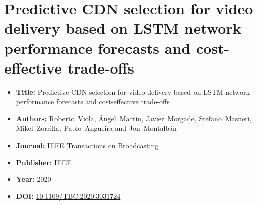 

\section[Predictive CDN selection for video delivery based on LSTM network performance forecasts and cost-effective trade-offs]{Predictive CDN selection for video delivery based on LSTM network performance forecasts and cost-effective trade-offs}
\label{chap:IEEETBC2020}
\begin{itemize} \itemsep1pt\parskip0pt
	\item \textbf{Title:} Predictive CDN selection for video delivery based on LSTM network performance forecasts and cost-effective trade-offs
	\item \textbf{Authors:} Roberto~Viola, \'Angel~Mart\'in, Javier~Morgade, Stefano~Masneri, Mikel~Zorrilla, Pablo~Angueira and Jon~Montalb\'an
	\item \textbf{Journal:} IEEE Transactions on Broadcasting
	\item \textbf{Publisher:} IEEE
	\item \textbf{Year:} 2020
	\item \textbf{DOI:}  \url{10.1109/TBC.2020.3031724}
\end{itemize}	

